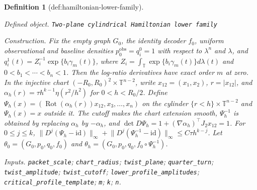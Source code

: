 \documentclass{article}
\newtheorem{definition}{Definition}
\begin{document}
\begin{definition}[def:hamiltonian-lower-family]\label{def:hamiltonian-lower-family}
\par\smallskip\noindent\emph{Defined object.} \texttt{Two-\allowbreak{}plane cylindrical Hamiltonian lower family}
\par\smallskip\noindent\emph{Construction.} Fix the empty graph \(G_0\), the identity decoder \(f_0\), uniform observational and baseline densities \(p_0^{\mathrm{obs}}=q_i^0=1\) with respect to \(\lambda^n\) and \(\lambda\), and \(q_i^1(t)=Z_i^{-1}\exp\{b_i\gamma_m(t)\}\), where \(Z_i=\int_{\mathbb T}\exp\{b_i\gamma_m(t)\}d\lambda(t)\) and \(0<b_1<\cdots<b_n<1\). Then the log-ratio derivatives have exact order \(m\) at zero. In the injective chart \((-R_0,R_0)^2\times\mathbb T^{n-2}\), write \(x_{12}=(x_1,x_2)\), \(r=|x_{12}|\), and \(\alpha_h(r)=\tau h^{k-1}\eta(r^2/h^2)\) for \(0<h<R_0/2\). Define \(\Psi_h(x)=(\operatorname{Rot}(\alpha_h(r))x_{12},x_3,\ldots,x_n)\) on the cylinder \(\{r<h\}\times\mathbb T^{n-2}\) and \(\Psi_h(x)=x\) outside it. The cutoff makes the chart extension smooth, \(\Psi_h^{-1}\) is obtained by replacing \(\alpha_h\) by \(-\alpha_h\), and \(\det D\Psi_h=1+(\nabla\alpha_h)^\top J_2x_{12}=1\). For \(0\le j\le k\), \(\lVert D^j(\Psi_h-\mathrm{id})\rVert_\infty+\lVert D^j(\Psi_h^{-1}-\mathrm{id})\rVert_\infty\le C\tau h^{k-j}\). Let \(\theta_0=(G_0,p_0,q_0,f_0)\) and \(\theta_h=(G_0,p_0,q_0,f_0\circ\Psi_h^{-1})\).
\par\smallskip\noindent\emph{Inputs.} \texttt{packet\_\allowbreak{}scale}; \texttt{chart\_\allowbreak{}radius}; \texttt{twist\_\allowbreak{}plane}; \texttt{quarter\_\allowbreak{}turn}; \texttt{twist\_\allowbreak{}amplitude}; \texttt{twist\_\allowbreak{}cutoff}; \texttt{lower\_\allowbreak{}profile\_\allowbreak{}amplitudes}; \texttt{critical\_\allowbreak{}profile\_\allowbreak{}template}; \texttt{m}; \texttt{k}; \texttt{n}.
\end{definition}
\end{document}
